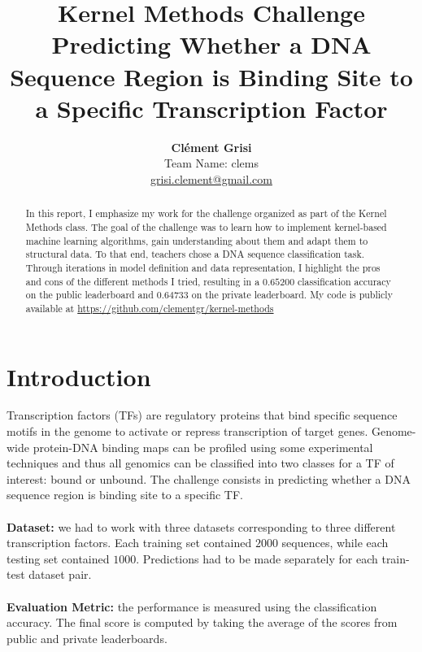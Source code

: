 \documentclass[final]{cvpr}
\begin{document}
	
	\title{ Kernel Methods Challenge\\
		\vspace{1mm}
		\large \normalfont Predicting Whether a DNA Sequence Region is Binding Site to a Specific Transcription Factor}
	
	\author{\textbf{Clément Grisi}\\
		Team Name: clems\\
		\small \url{grisi.clement@gmail.com}
	}
	
	\maketitle
	
	\begin{abstract}
		In this report, I emphasize my work for the challenge organized as part of the Kernel Methods class. The goal of the challenge was to learn how to implement kernel-based machine learning algorithms, gain understanding about them and adapt them to structural data. To that end, teachers chose a DNA sequence classification task. Through iterations in model definition and data representation, I highlight the pros and cons of the different methods I tried, resulting in a $0.65200$ classification accuracy on the public leaderboard and $0.64733$ on the private leaderboard. My code is publicly available at \small{\url{https://github.com/clementgr/kernel-methods}}
	\end{abstract}
	
	\vspace{-3mm}
	
	\section{Introduction}
	
	Transcription factors (TFs) are regulatory proteins that bind specific sequence motifs in the genome to activate or repress transcription of target genes. Genome-wide protein-DNA binding maps can be profiled using some experimental techniques and thus all genomics can be classified into two classes for a TF of interest: bound or unbound. The challenge consists in predicting whether a DNA sequence region is binding site to a specific TF.\\
	\\
	\textbf{Dataset:} we had to work with three datasets corresponding to three different transcription factors. Each training set contained $2000$ sequences, while each testing set contained $1000$. Predictions had to be made separately for each train-test dataset pair.\\
	\\
	\textbf{Evaluation Metric:} the performance is measured using the classification accuracy. The final score is computed by taking the average of the scores from public and private leaderboards.
	
\end{document}
